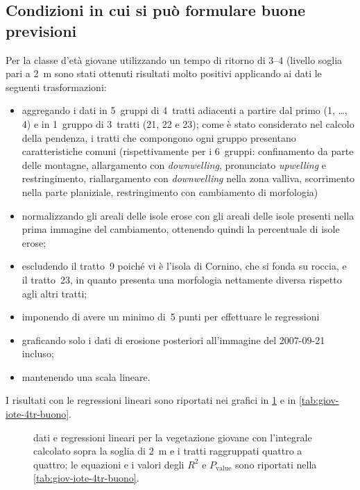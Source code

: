 \subsection{Condizioni in cui si può formulare buone previsioni}
Per la classe d'età giovane utilizzando un tempo di ritorno di \SIrange[range-phrase = {-}, range-units = single]{3}{4}{\mesi} (livello soglia pari a \SI{2}{\m} sono stati ottenuti risultati molto positivi applicando ai dati le seguenti trasformazioni:
%
\begin{itemize}
	\item aggregando i dati in 5~gruppi di 4~tratti adiacenti a partire dal primo (1, \ldots, 4) e in 1~gruppo di 3~tratti (21, 22 e 23);
		come è stato considerato nel calcolo della pendenza, i tratti che compongono ogni gruppo presentano caratteristiche comuni
		(rispettivamente per i 6~gruppi: confinamento da parte delle montagne, allargamento con \emph{downwelling}, pronunciato \emph{upwelling} e restringimento, riallargamento con \emph{downwelling} nella zona valliva, scorrimento nella parte planiziale, restringimento con cambiamento di morfologia)
	\item normalizzando gli areali delle isole erose con gli areali delle isole presenti nella prima immagine del cambiamento, ottenendo quindi la percentuale di isole erose;
	\item escludendo il tratto~9 poiché vi è l'isola di Cornino, che si fonda su roccia, e il tratto~23, in quanto presenta una morfologia nettamente diversa rispetto agli altri tratti;
	\item imponendo di avere un minimo di~5 punti per effettuare le regressioni
	\item graficando solo i dati di erosione posteriori all'immagine del 2007-09-21 incluso;
	\item mantenendo una scala lineare.
\end{itemize}
%
I risultati con le regressioni lineari sono riportati nei grafici in \cref{graph:giov-iote-4tr-buono} e in \cref{tab:giov-iote-4tr-buono}.
%
\begin{figure}
	\centering
	
	\caption[dati e regressioni lineari per la vegetazione giovane]{dati e regressioni lineari per la vegetazione giovane con l'integrale calcolato sopra la soglia di \SI{2}{\m} e i tratti raggruppati quattro a quattro; le equazioni e i valori degli $R^2$ e $P_\mathrm{value}$ sono riportati nella \cref{tab:giov-iote-4tr-buono}.}
	\label{graph:giov-iote-4tr-buono}
\end{figure}
